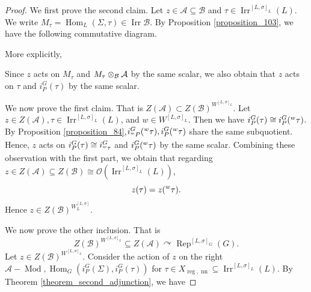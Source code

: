 \documentclass[8pt]{article}
\DeclareMathOperator{\Rep}{Rep}
\DeclareMathOperator{\Hom}{Hom}
\DeclareMathOperator{\Mod}{Mod}
\DeclareMathOperator{\Irr}{Irr}
\DeclareMathOperator{\nn}{nn}
\DeclareMathOperator{\reg}{reg}
\newcommand{\cA}{\mathcal{A}}
\newcommand{\cB}{\mathcal{B}}
\newcommand{\Ouv}{\mathcal{O}}
\newcommand{\tens}[1]{%
  \mathbin{\mathop{\otimes}\displaylimits_{#1}}%
}
\begin{document}
\begin{proof}
  We first prove the second claim. Let $z\in \cA\subseteq\cB$ and $\tau\in\Irr^{[L,\sigma]_L}(L)$. We write $M_\tau=\Hom_L(\Sigma,\tau)\in\Irr\cB$. By Proposition \ref{proposition_103}, we have the following commutative diagram.
  \begin{center}
  \end{center}
  More explicitly,
  \begin{center}
  \end{center}
  Since $z$ acts on $M_\tau$ and $M_\tau\tens{\cB}\cA$ by the same scalar, we also obtain that $z$ acts on $\tau$ and $i_P^G(\tau)$ by the same scalar.
  \par We now prove the first claim. That is $Z(\cA)\subset Z(\cB)^{W^{[L,\sigma]_L}}$. Let $z\in Z(\cA),\tau\in\Irr^{[L,\sigma]_L}(L)$, and $w\in W^{[L,\sigma]_L}$.
  Then we have $i_P^G(\tau)\cong i_P^G(\prescript{w}{}{\tau})$. By Proposition \ref{proposition_84},$i_{\prescript{w}{}{P}}^G(\prescript{w}{}{\tau}),i_P^G(\prescript{w}{}{\tau})$ share the same subquotient.
  Hence, $z$ acts on $i_P^G(\tau)\cong i_{\prescript{w}{}{\tau}}^G$ and $i_P^G(\prescript{w}{}{\tau})$ by the same scalar. Combining these observation with the first part, we obtain that regarding $z\in Z(\cA)\subseteq Z(\cB)\cong \Ouv(\Irr^{[L,\sigma]_L}(L))$,
  \begin{equation*}
    z(\tau) =z(\prescript{w}{}{\tau}).
  \end{equation*}
  Hence $z\in Z(\cB)^{W^[L,\sigma]_L}$.
  \par We now prove the other inclusion. That is 
  \begin{equation*}
    Z(\cB)^{W^{[L,\sigma]_L}}\subseteq Z(\cA)\curvearrowright\Rep^{[L,\sigma]_G}(G).
  \end{equation*}
  Let $z\in Z(\cB)^{W^{[L,\sigma]_L}}$. Consider the action of $z$ on the right $\cA-\Mod,\Hom_G(i_P^G(\Sigma),i_P^G(\tau))$ for $\tau\in X_{\reg,\nn}\subseteq\Irr^{[L,\sigma]_L}(L)$. By Theorem \ref{theorem_second_adjunction}, we have

\end{proof}
\end{document}
